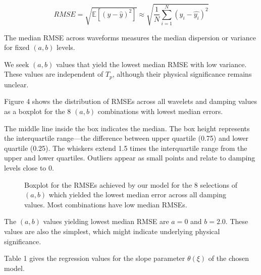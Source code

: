 \[RMSE = \sqrt{\mathbb{E}[(y - \widehat{y})^{2}]} \approx \sqrt{\frac{1}{N}\sum_{i = 1}^{N}(y_i - \widehat{y_i})^{2}}\]

The median RMSE across waveforms measures the median dispersion or
variance for fixed \((a, b)\) levels.

We seek \((a, b)\) values that yield the lowest median RMSE with low
variance. These values are independent of \(T_p\), although their
physical significance remains unclear.

Figure 4 shows the distribution of RMSEs across all wavelets and damping
values as a boxplot for the 8 \((a, b)\) combinations with lowest median
errors.

The middle line inside the box indicates the median. The box height
represents the interquartile range---the difference between upper
quartile (0.75) and lower quartile (0.25). The whiskers extend 1.5 times
the interquartile range from the upper and lower quartiles. Outliers
appear as small points and relate to damping levels close to 0.

\begin{figure}
\centering
{}
\caption{Boxplot for the RMSEs achieved by our model for the 8
selections of \((a, b)\) which yielded the lowest median error across
all damping values. Most combinations have low median RMSEs.}
\end{figure}

The \((a, b)\) values yielding lowest median RMSE are \(a = 0\) and
\(b = 2.0\). These values are also the simplest, which might indicate
underlying physical significance.

Table 1 gives the regression values for the slope parameter
\(\theta(\xi)\) of the chosen model.

